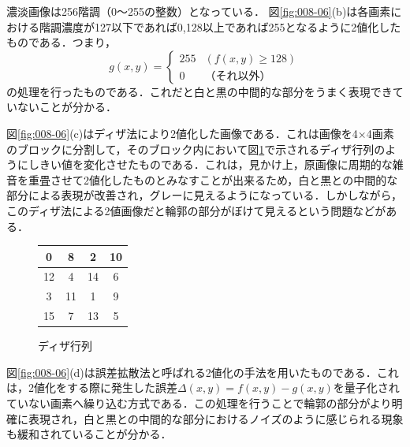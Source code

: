 濃淡画像は256階調（0～255の整数）となっている．
%
図\ref{fig:008-06}(b)は各画素における階調濃度が127以下であれば0,128以上であれば255となるように2値化したものである．つまり，
\begin{equation}
g(x,y)=
\left \{
\begin{array}{cc}
255 & (f(x,y)\geq 128) \\
0 & （それ以外）
\end{array}
\right .
\end{equation}
の処理を行ったものである．これだと白と黒の中間的な部分をうまく表現できていないことが分かる．

図\ref{fig:008-06}(c)はディザ法により2値化した画像である．これは画像を4×4画素のブロックに分割して，そのブロック内において図\ref{fig:dither_m}で示されるディザ行列のようにしきい値を変化させたものである．これは，見かけ上，原画像に周期的な雑音を重畳させて2値化したものとみなすことが出来るため，白と黒との中間的な部分による表現が改善され，グレーに見えるようになっている．しかしながら，このディザ法による2値画像だと輪郭の部分がぼけて見えるという問題などがある．

\begin{figure}[h]
\begin{center}
\begin{tabular}{|c|c|c|c|}
\hline
0 & 8 & 2 & 10 \\
\hline 
12 & 4 & 14 & 6 \\
\hline
3 & 11 & 1 & 9 \\
\hline
15 & 7 & 13 & 5 \\
\hline 
\end{tabular}
\end{center}
\caption{ディザ行列}
\label{fig:dither_m}
\end{figure}

図\ref{fig:008-06}(d)は誤差拡散法と呼ばれる2値化の手法を用いたものである．これは，2値化をする際に発生した誤差$\Delta(x,y)=f(x,y)-g(x,y)$を量子化されていない画素へ繰り込む方式である．この処理を行うことで輪郭の部分がより明確に表現され，白と黒との中間的な部分におけるノイズのように感じられる現象も緩和されていることが分かる．

